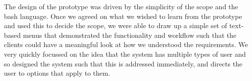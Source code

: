 The design of the prototype was driven by the simplicity of the scope and the bash language. Once we agreed on
what we wished to learn from the prototype and used this to decide the scope, we were able to draw up a simple
set of text-based menus that demonstrated the functionality and workflow such that the clients could have a 
meaningful look at how we understood the requirements. We very quickly focussed on the idea that the system has 
multiple types of user and so designed the system such that this is addressed immediately, and directs the user to
options that apply to them.